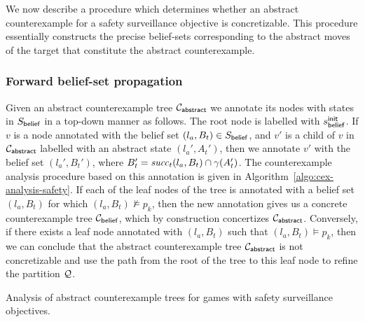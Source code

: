 We now describe a procedure which determines whether an abstract counterexample for a safety surveillance objective is concretizable. This procedure essentially constructs the precise belief-sets corresponding to the abstract moves of the target that constitute the abstract counterexample.

\subsubsection{Forward belief-set propagation}
Given an abstract counterexample tree $\mathcal{C}_{\mathsf{abstract}}$ we annotate its nodes with states in $S_{\mathsf{belief}}$ in a top-down manner as follows. 
The root node is labelled with $s_{\mathsf{belief}}^{\mathsf{init}}$. 
If $v$ is a node annotated with the belief set $(l_a,B_t) \in S_{\mathsf{belief}}$, and  $v'$ is a child of $v$ in $\mathcal{C}_{\mathsf{abstract}}$ labelled with an abstract state $(l_a',A_t')$, then we annotate $v'$ with the belief set $(l_a',B_t')$, where 
$B_t' = \mathit{succ}_t(l_a,B_t) \cap \gamma(A_t')$. The counterexample analysis procedure based on this annotation is given in Algorithm~\ref{algo:cex-analysis-safety}.
If each of the leaf nodes of the tree is annotated with a belief set $(l_a,B_t)$ for which $(l_a,B_t) \not\models p_k$, then the new annotation gives us a concrete counterexample tree $\mathcal{C}_{\mathsf{belief}}$, which by construction concertizes $\mathcal{C}_{\mathsf{abstract}}$. Conversely, if there exists a leaf node annotated with $(l_a,B_t)$ such that $(l_a,B_t) \models p_k$, then we can conclude that the abstract counterexample tree $\mathcal{C}_{\mathsf{abstract}}$ is not concretizable and use the path from the root of the tree to this leaf node to refine the partition $\mathcal{Q}$.
\begin{algorithm}[h]
\small
{}

\smallskip

%
{\KwRet{$\pi$;}}
{}

\smallskip


\caption{Analysis of abstract counterexample trees for games with safety surveillance objectives.}
\label{algo:cex-analysis-safety}
\end{algorithm}

